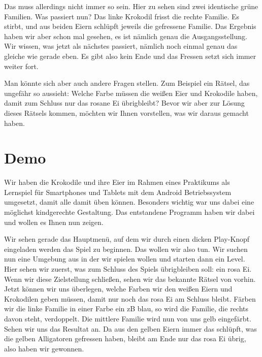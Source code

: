 \documentclass{scrartcl}
\begin{document}
	Das muss allerdings nicht immer so sein.
	Hier zu sehen sind zwei identische grüne Familien.
	Was passiert nun?
	Das linke Krokodil frisst die rechte Familie.
	Es stirbt, und aus beiden Eiern schlüpft jeweils die gefressene Familie.
	Das Ergebnis haben wir aber schon mal gesehen, es ist nämlich genau die Ausgangsstellung.
	Wir wissen, was jetzt als nächstes passiert, nämlich noch einmal genau das gleiche wie gerade eben.
	Es gibt also kein Ende und das Fressen setzt sich immer weiter fort.

	Man könnte sich aber auch andere Fragen stellen.
	Zum Beispiel ein Rätsel, das ungefähr so aussieht:
	Welche Farbe müssen die weißen Eier und Krokodile haben, damit zum Schluss nur das rosane Ei übrigbleibt?
	Bevor wir aber zur Lösung dieses Rätsels kommen, möchten wir Ihnen vorstellen, was wir daraus gemacht haben.


	\section{Demo}
	Wir haben die Krokodile und ihre Eier im Rahmen eines Praktikums als Lernspiel für Smartphones und Tablets mit dem Android Betriebssystem umgesetzt, damit alle damit üben können.
	Besonders wichtig war uns dabei eine möglichst kindgerechte Gestaltung.
	Das entstandene Programm haben wir dabei und wollen es Ihnen nun zeigen.

	Wir sehen gerade das Hauptmenü, auf dem wir durch einen dicken Play-Knopf eingeladen werden das Spiel zu beginnen.
	Das wollen wir also tun.
	Wir suchen nun eine Umgebung aus in der wir spielen wollen und starten dann ein Level.
	Hier sehen wir zuerst, was zum Schluss des Spiels übrigbleiben soll: ein rosa Ei.
	Wenn wir diese Zielstellung schließen, sehen wir das bekannte Rätsel von vorhin.
	Jetzt können wir uns überlegen, welche Farben wir den weißen Eiern und Krokodilen geben müssen, damit nur noch das rosa Ei am Schluss bleibt.
	Färben wir die linke Familie in einer Farbe ein zB blau, so wird die Familie, die rechts davon steht, verdoppelt.
	Die mittlere Familie wird nun von uns gelb eingefärbt.
	Sehen wir uns das Resultat an.
	Da aus den gelben Eiern immer das schlüpft, was die gelben Alligatoren gefressen haben, bleibt am Ende nur das rosa Ei übrig, also haben wir gewonnen. 
	
\end{document}

